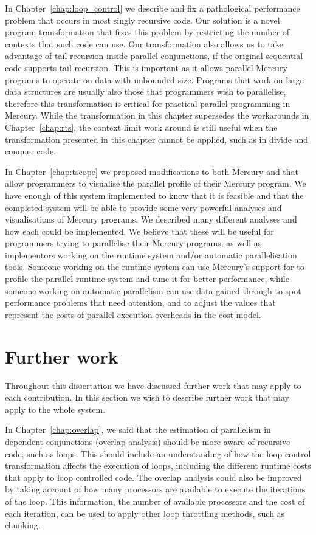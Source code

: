 In Chapter~\ref{chap:loop_control}
we describe and fix a pathological performance problem that occurs in most
singly recursive code.
Our solution is a novel program transformation that fixes this problem by
restricting the number of contexts that such code can use.
Our transformation also
allows us to take advantage of tail recursion inside parallel conjunctions,
if the original sequential code supports tail recursion.
This is important as it allows parallel Mercury programs to operate on data
with unbounded size.
Programs that work on large data structures are usually also those that
programmers wish to parallelise,
therefore this transformation is critical for practical parallel programming
in Mercury.
While the transformation in this chapter supersedes the workarounds in
Chapter~\ref{chap:rts},
the context limit work around is still useful when the transformation
presented in this chapter cannot
be applied, such as in divide and conquer code.

In Chapter~\ref{chap:tscope} we proposed modifications to both Mercury and
\tscope that allow programmers to visualise the parallel profile of their
Mercury program.
We have enough of this system implemented to know that it is feasible and
that the completed system will be able to provide some very powerful
analyses and visualisations of Mercury programs.
We described many different analyses and how each could be implemented.
We believe that these will be useful for programmers trying to parallelise
their Mercury programs, as well as implementors working on the runtime
system and/or automatic parallelisation tools.
Someone working on the runtime system can use Mercury's support for \tscope
to profile the parallel runtime system and tune it for better performance,
while someone working on automatic parallelism can use data gained through
\tscope to spot performance problems that need attention,
and to adjust the values that represent the costs of parallel execution
overheads in the cost model.

\section{Further work}

Throughout this dissertation we have discussed further work that may apply to
each contribution.
In this section we wish to describe further work that may apply to the whole
system.

In Chapter~\ref{chap:overlap},
we said that the estimation of parallelism in dependent conjunctions
(overlap analysis) should be more aware of recursive code, such as loops.
This should include an understanding of how the loop control transformation
affects the execution of loops,
including the different runtime costs that apply to loop controlled code.
The overlap analysis could also be improved by taking account of how many
processors are available to execute the iterations of the loop.
This information,
the number of available processors and the cost of each iteration,
can be used to apply other loop throttling methods,
such as chunking.

